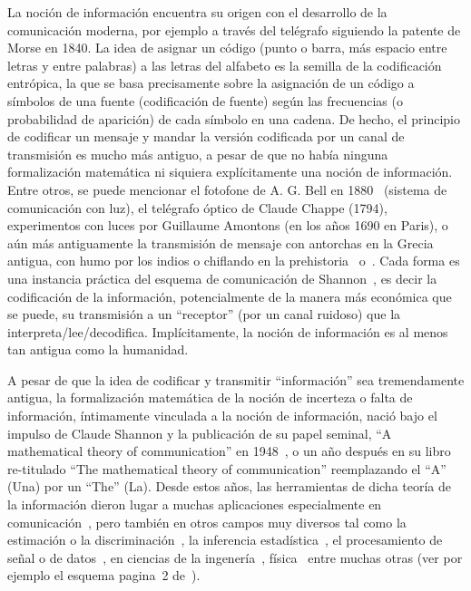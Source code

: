 \label{Sec:SZ:Introduccion}


La  noci\'on  de informaci\'on  encuentra  su origen  con  el  desarrollo de  la
 comunicaci\'on  moderna, por ejemplo  a trav\'es  del tel\'egrafo  siguiendo la
 patente de Morse en 1840. La idea  de asignar un c\'odigo (punto o barra, m\'as
 espacio entre letras y entre palabras)  a las letras del alfabeto es la semilla
 de  la  codificaci\'on  entr\'opica,  la  que se  basa  precisamente  sobre  la
 asignaci\'on  de un  c\'odigo a  s\'imbolos  de una  fuente (codificaci\'on  de
 fuente)  seg\'un  las  frecuencias  (o  probabilidad de  aparici\'on)  de  cada
 s\'imbolo en  una cadena.   De hecho,  el principio de  codificar un  mensaje y
 mandar la  versi\'on codificada  por un canal  de transmisi\'on es  mucho m\'as
 antiguo,  a pesar  de que  no hab\'ia  ninguna formalizaci\'on  matem\'atica ni
 siquiera expl\'icitamente una noci\'on de informaci\'on.  Entre otros, se puede
 mencionar el fotofone de A.  G.  Bell en 1880~\cite{Bel1880, Bru90} (sistema de
 comunicaci\'on  con luz),  el  tel\'egrafo \'optico  de  Claude Chappe  (1794),
 experimentos con luces por Guillaume Amontons  (en los a\~nos 1690 en Paris), o
 a\'un m\'as antiguamente la transmisi\'on de mensaje con antorchas en la Grecia
 antigua, con  humo por  los indios o  chiflando en  la prehistoria~\cite{Mon08}
 o~\cite[Cap.~3]{Arn01}.  Cada forma es  una instancia pr\'actica del esquema de
 comunicaci\'on de Shannon~\cite{Sha48, ShaWea64}, es decir la codificaci\'on de
 la informaci\'on, potencialmente  de la manera m\'as econ\'omica  que se puede,
 su   transmisi\'on  a   un  ``receptor''   (por  un   canal  ruidoso)   que  la
 interpreta/lee/decodifica.  Impl\'icitamente,  la noci\'on de  informaci\'on es
 al menos tan antigua como la humanidad.

A  pesar  de  que  la  idea  de codificar  y  transmitir  ``informaci\'on''  sea
tremendamente  antigua,  la  formalizaci\'on  matem\'atica  de  la  noci\'on  de
incerteza o  falta de  informaci\'on, \'intimamente vinculada  a la  noci\'on de
informaci\'on, naci\'o bajo  el impulso de Claude Shannon  y la publicaci\'on de
su   papel   seminal,   ``A    mathematical   theory   of   communication''   en
1948~\cite{Sha48},  o   un  a\~no  despu\'es  en  su   libro  re-titulado  ``The
mathematical  theory  of communication''  reemplazando  el  ``A''  (Una) por  un
``The''  (La). Desde  estos a\~nos,  las herramientas  de dicha  teor\'ia  de la
informaci\'on   dieron   lugar    a   muchas   aplicaciones   especialmente   en
comunicaci\'on~\cite[y  ref.]{CovTho06, Ver98, Gal01},  pero tambi\'en  en otros
campos  muy diversos  tal  como la  estimaci\'on  o la  discriminaci\'on~\cite[y
ref.]{CovTho06,      Kay93,       Bos07,      LehCas98},      la      inferencia
estad\'istica~\cite{Rob07,   Par06},   el   procesamiento   de  se\~nal   o   de
datos~\cite[y   Ref.]{PhiRou92,   EbeMol00,    Bas13},   en   ciencias   de   la
ingener\'ia~\cite{Arn01,    Kap89,    KapKes92,   PhiRou92},    f\'isica~\cite[y
Ref.]{Arn01, OhyPet93,  Mer18} entre  muchas otras (ver  por ejemplo  el esquema
pagina~2 de~\cite{CovTho06}).

